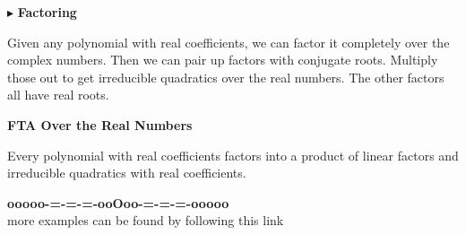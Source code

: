 \documentclass{ximera}
\begin{document}
$\blacktriangleright$  \textbf{Factoring}




Given any polynomial with real coefficients, we can factor it completely over the complex numbers.  Then we can pair up factors with conjugate roots. Multiply those out to get irreducible quadratics over the real numbers.  The other factors all have real roots.





\begin{theorem}  \textbf{\textcolor{-red!75!green}{FTA Over the Real Numbers}} 

Every polynomial with real coefficients factors into a product of linear factors and irreducible quadratics with real coefficients.



\end{theorem}




































































\begin{center}
\textbf{\textcolor{green!50!black}{ooooo-=-=-=-ooOoo-=-=-=-ooooo}} \\

more examples can be found by following this link\\ 

\end{center}
\end{document}
